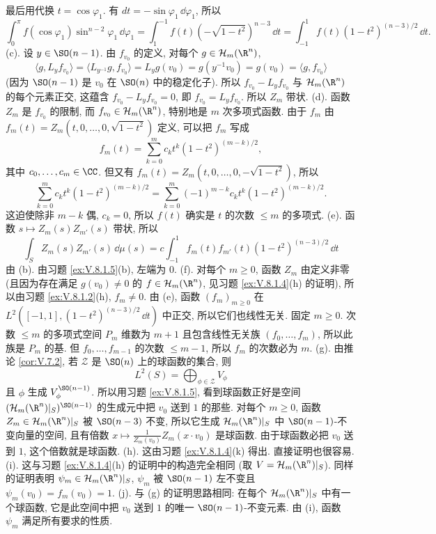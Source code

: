 \begin{solution}
\[\]
最后用代换 $t = \cos\varphi_1$. 有 $dt = -\sin\varphi_1\,\dd\varphi_1$, 所以
\[
\int_0^{\pi}f(\cos\varphi_1)\sin^{n-2}\varphi_1\,\dd\varphi_1 = \int_1^{-1}f(t)(-\sqrt{1-t^2})^{n-3}\,\dd t = \int_{-1}^1 f(t)(1-t^2)^{(n-3)/2}\,\dd t.
\]
(c). 设 $y \in \SO(n-1)$. 由 $f_{v_0}$ 的定义, 对每个 $g \in \mathcal{H}_m(\R^n)$,
\[
\langle g, L_yf_{v_0} \rangle = \langle L_{y^{-1}}g, f_{v_0} \rangle = L_yg(v_0) = g(y^{-1}v_0) = g(v_0) = \langle g, f_{v_0} \rangle
\]
(因为 $\SO(n-1)$ 是 $v_0$ 在 $\SO(n)$ 中的稳定化子). 所以 $f_{v_0} - L_yf_{v_0}$ 与 $\mathcal{H}_m(\R^n)$ 的每个元素正交, 这蕴含 $f_{v_0} - L_yf_{v_0} = 0$, 即 $f_{v_0} = L_yf_{v_0}$. 所以 $Z_m$ 带状.
(d). 函数 $Z_m$ 是 $f_{v_0}$ 的限制, 而 $f_{v_0} \in \mathcal{H}_m(\R^n)$, 特别地是 $m$ 次多项式函数. 由于 $f_m$ 由 $f_m(t) = Z_m(t, 0, \ldots, 0, \sqrt{1-t^2})$ 定义, 可以把 $f_m$ 写成
\[
f_m(t) = \sum_{k=0}^m c_kt^k(1-t^2)^{(m-k)/2},
\]
其中 $c_0, \ldots, c_m \in \CC$. 但又有 $f_m(t) = Z_m(t, 0, \ldots, 0, -\sqrt{1-t^2})$, 所以
\[
\sum_{k=0}^m c_kt^k(1-t^2)^{(m-k)/2} = \sum_{k=0}^m(-1)^{m-k}c_kt^k(1-t^2)^{(m-k)/2}.
\]
这迫使除非 $m - k$ 偶, $c_k = 0$, 所以 $f(t)$ 确实是 $t$ 的次数 $\leq m$ 的多项式.
(e). 函数 $s \longmapsto Z_m(s)Z_{m'}(s)$ 带状, 所以
\[
\int_S Z_m(s)Z_{m'}(s)\,\dd\mu(s) = c\int_{-1}^1 f_m(t)f_{m'}(t)(1-t^2)^{(n-3)/2}\,\dd t
\]
由 (b). 由习题 \ref{ex:V.8.1.5}(b), 左端为 $0$.
(f). 对每个 $m \geq 0$, 函数 $Z_m$ 由定义非零 (且因为存在满足 $g(v_0) \neq 0$ 的 $f \in \mathcal{H}_m(\R^n)$, 见习题 \ref{ex:V.8.1.4}(h) 的证明), 所以由习题 \ref{ex:V.8.1.2}(h), $f_m \neq 0$. 由 (e), 函数 $(f_m)_{m \geq 0}$ 在 $L^2([-1,1], (1-t^2)^{(n-3)/2}\,\dd t)$ 中正交, 所以它们也线性无关. 固定 $m \geq 0$. 次数 $\leq m$ 的多项式空间 $P_m$ 维数为 $m + 1$ 且包含线性无关族 $(f_0, \ldots, f_m)$, 所以此族是 $P_m$ 的基. 但 $f_0, \ldots, f_{m-1}$ 的次数 $\leq m - 1$, 所以 $f_m$ 的次数必为 $m$.
(g). 由推论 \ref{cor:V.7.2}, 若 $\mathcal{Z}$ 是 $\SO(n)$ 上的球函数的集合, 则
\[
L^2(S) = \bigoplus_{\phi \in \mathcal{Z}}V_{\phi}
\]
且 $\phi$ 生成 $V_{\phi}^{\SO(n-1)}$. 所以用习题 \ref{ex:V.8.1.5}, 看到球函数正好是空间 $(\mathcal{H}_m(\R^n)|_S)^{\SO(n-1)}$ 的生成元中把 $v_0$ 送到 $1$ 的那些.
对每个 $m \geq 0$, 函数 $Z_m \in \mathcal{H}_m(\R^n)|_S$ 被 $\SO(n-3)$ 不变, 所以它生成 $\mathcal{H}_m(\R^n)|_S$ 中 $\SO(n-1)$-不变向量的空间, 且有倍数 $x \longmapsto \frac{1}{Z_m(v_0)}Z_m(x \cdot v_0)$ 是球函数. 由于球函数必把 $v_0$ 送到 $1$, 这个倍数就是球函数.
(h). 这由习题 \ref{ex:V.8.1.4}(k) 得出. 直接证明也很容易.
(i). 这与习题 \ref{ex:V.8.1.4}(h) 的证明中的构造完全相同 (取 $V = \mathcal{H}_m(\R^n)|_S$). 同样的证明表明 $\psi_m \in \mathcal{H}_m(\R^n)|_S$, $\psi_m$ 被 $\SO(n-1)$ 左不变且 $\psi_m(v_0) = f_m(v_0) = 1$.
(j). 与 (g) 的证明思路相同: 在每个 $\mathcal{H}_m(\R^n)|_S$ 中有一个球函数, 它是此空间中把 $v_0$ 送到 $1$ 的唯一 $\SO(n-1)$-不变元素. 由 (i), 函数 $\psi_m$ 满足所有要求的性质.
\end{solution}


